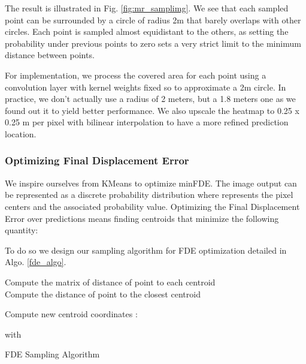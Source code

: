 \documentclass[letterpaper, 10 pt, conference]{ieeeconf}
\begin{document}
The result is illustrated in Fig. \ref{fig:mr_samplimg}. We see that each sampled point can be surrounded by a circle of radius 2m that barely overlaps with other circles. Each point is sampled almost equidistant to the others, as setting the probability under previous points to zero sets a very strict limit to the minimum distance between points.

For implementation, we process the covered area for each point using a convolution layer with kernel weights fixed so to approximate a 2m circle. In practice, we don't actually use a radius of 2 meters, but a 1.8 meters one as we found out it to yield better performance. We also upscale the heatmap to 0.25 x 0.25 m per pixel with bilinear interpolation to have a more refined prediction location.



\subsubsection{Optimizing Final Displacement Error}

We inspire ourselves from KMeans to optimize minFDE.
The image output can be represented as a discrete probability distribution  where  represents the pixel centers and  the associated probability value. Optimizing the Final Displacement Error over  predictions means finding  centroids  that minimize the following quantity:



To do so we design our sampling algorithm for FDE optimization detailed in Algo. \ref{fde_algo}.

\begin{algorithm}
\DontPrintSemicolon 
{}
 {
    Compute  the matrix of distance of point  to each centroid  \\
    Compute  the distance of point  to the closest centroid  \\
     {
        Compute new centroid coordinates :
        
        with 

    }
}
\caption{ FDE Sampling Algorithm\label{IR}}
\label{fde_algo}
\end{algorithm}
\end{document}
